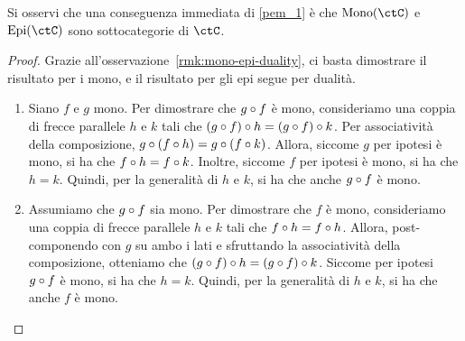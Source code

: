 Si osservi che una conseguenza immediata di \ref{pem_1} è che \(\Mono[\ctC]\) e \(\Epi[\ctC]\) sono sottocategorie di \(\ctC\).
\begin{proof}
	Grazie all'osservazione~\ref{rmk:mono-epi-duality},	ci basta dimostrare il risultato per i mono,	e il risultato per gli epi segue per dualità.
	\begin{enumerate}
		\item Siano \(f\) e \(g\) mono. Per dimostrare che \(g \circ f\) è mono, consideriamo una coppia di frecce parallele \(h\) e \(k\) tali che \((g \circ f) \circ h = (g \circ f) \circ k\). Per associatività della composizione, \(g \circ (f \circ h) = g \circ (f \circ k)\). Allora, siccome \(g\) per ipotesi è mono, si ha che \(f \circ h = f \circ k\). Inoltre, siccome \(f\) per ipotesi è mono, si ha che \(h = k\). Quindi, per la generalità di \(h\) e \(k\), si ha che anche \(g \circ f\) è mono.
		\item Assumiamo che \(g \circ f\) sia mono. Per dimostrare che \(f\) è mono, consideriamo una coppia di frecce parallele \(h\) e \(k\) tali che \(f \circ h = f \circ h\). Allora, post-componendo con \(g\) su ambo i lati e sfruttando la associatività della composizione, otteniamo che \((g \circ f) \circ h = (g \circ f) \circ k\). Siccome per ipotesi \(g \circ f\) è mono, si ha che \(h = k\). Quindi, per la generalità di \(h\) e \(k\), si ha che anche \(f\) è mono. \qedhere
	\end{enumerate}
\end{proof}

